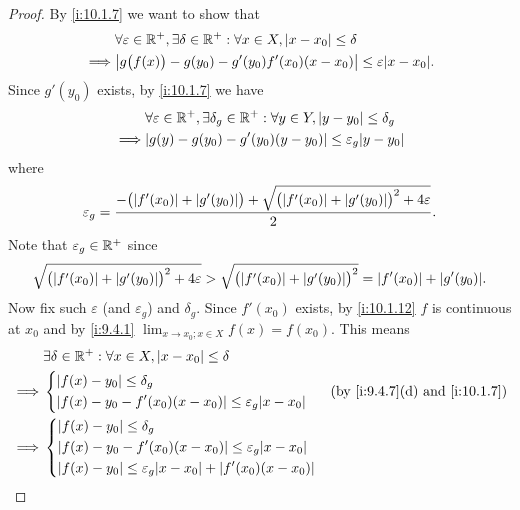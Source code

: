 \begin{proof}
  By \cref{i:10.1.7} we want to show that
  \begin{align*}
             & \forall \varepsilon \in \R^+, \exists \delta \in \R^+ : \forall x \in X, \abs{x - x_0} \leq \delta \\
    \implies & \abs{g\big(f(x)\big) - g(y_0) - g'(y_0) f'(x_0) (x - x_0)} \leq \varepsilon \abs{x - x_0}.
  \end{align*}
  Since \(g'(y_0)\) exists, by \cref{i:10.1.7} we have
  \begin{align*}
             & \forall \varepsilon \in \R^+, \exists \delta_g \in \R^+ : \forall y \in Y, \abs{y - y_0} \leq \delta_g \\
    \implies & \abs{g(y) - g(y_0) - g'(y_0) (y - y_0)} \leq \varepsilon_g \abs{y - y_0}
  \end{align*}
  where
  \[
    \varepsilon_g = \dfrac{-\big(\abs{f'(x_0)} + \abs{g'(y_0)}\big) + \sqrt{\big(\abs{f'(x_0)} + \abs{g'(y_0)}\big)^2 + 4 \varepsilon}}{2}.
  \]
  Note that \(\varepsilon_g \in \mathbb{R}^+\) since
  \[
    \sqrt{\big(\abs{f'(x_0)} + \abs{g'(y_0)}\big)^2 + 4 \varepsilon} > \sqrt{\big(\abs{f'(x_0)} + \abs{g'(y_0)}\big)^2} = \abs{f'(x_0)} + \abs{g'(y_0)}.
  \]
  Now fix such \(\varepsilon\) (and \(\varepsilon_g\)) and \(\delta_g\).
  Since \(f'(x_0)\) exists, by \cref{i:10.1.12} \(f\) is continuous at \(x_0\) and by \cref{i:9.4.1} \(\lim_{x \to x_0 ; x \in X} f(x) = f(x_0)\).
  This means
  \begin{align*}
             & \exists \delta \in \R^+ : \forall x \in X, \abs{x - x_0} \leq \delta                 \\
    \implies & \begin{dcases}
                 \abs{f(x) - y_0} \leq \delta_g \\
                 \abs{f(x) - y_0 - f'(x_0) (x - x_0)} \leq \varepsilon_g \abs{x - x_0}
               \end{dcases}                 &  & \text{(by \cref{i:9.4.7}(d) and \cref{i:10.1.7})}  \\
    \implies & \begin{dcases}
                 \abs{f(x) - y_0} \leq \delta_g                                        \\
                 \abs{f(x) - y_0 - f'(x_0) (x - x_0)} \leq \varepsilon_g \abs{x - x_0} \\
                 \abs{f(x) - y_0} \leq \varepsilon_g \abs{x - x_0} + \abs{f'(x_0) (x - x_0)}
               \end{dcases}           \\

\end{align*}
\end{proof}
